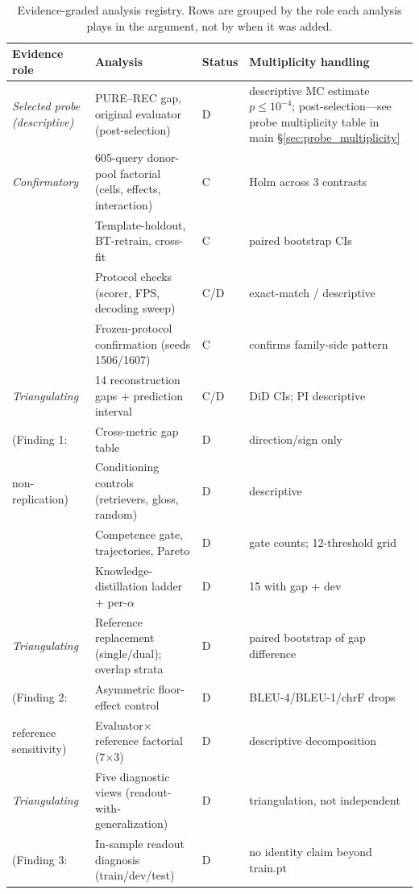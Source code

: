 \documentclass[pdflatex,sn-chicago]{sn-jnl}
\begin{document}
\begin{table}[h]
\centering
\scriptsize\setlength{\tabcolsep}{2pt}
\caption{Evidence-graded analysis registry. Rows are grouped by the role each analysis plays in the argument, not by when it was added.}
\label{tab:si_provenance}
\begin{tabular}{p{2.5cm}p{5.0cm}p{0.9cm}p{3.6cm}}
\toprule
Evidence role & Analysis & Status & Multiplicity handling \\
\midrule
\emph{Selected probe (descriptive)} & PURE--REC gap, original evaluator (post-selection) & D & descriptive MC estimate $p\leq10^{-4}$; post-selection---see probe multiplicity table in main \S\ref{sec:probe_multiplicity} \\
\addlinespace
\emph{Confirmatory} & 605-query donor-pool factorial (cells, effects, interaction) & C & Holm across 3 contrasts \\
 & Template-holdout, BT-retrain, cross-fit & C & paired bootstrap CIs \\
 & Protocol checks (scorer, FPS, decoding sweep) & C/D & exact-match / descriptive \\
 & Frozen-protocol confirmation (seeds 1506/1607) & C & confirms family-side pattern \\
\addlinespace
\emph{Triangulating} & 14 reconstruction gaps + prediction interval & C/D & DiD CIs; PI descriptive \\
 (Finding 1: & Cross-metric gap table & D & direction/sign only \\
  non-replication) & Conditioning controls (retrievers, gloss, random) & D & descriptive \\
 & Competence gate, trajectories, Pareto & D & gate counts; 12-threshold grid \\
 & Knowledge-distillation ladder + per-$\alpha$ & D & 15 with gap + dev \\
\addlinespace
\emph{Triangulating} & Reference replacement (single/dual); overlap strata & D & paired bootstrap of gap difference \\
 (Finding 2: & Asymmetric floor-effect control & D & BLEU-4/BLEU-1/chrF drops \\
  reference sensitivity) & Evaluator$\times$reference factorial (7$\times$3) & D & descriptive decomposition \\
\addlinespace
\emph{Triangulating} & Five diagnostic views (readout-with-generalization) & D & triangulation, not independent \\
 (Finding 3: & In-sample readout diagnosis (train/dev/test) & D & no identity claim beyond train.pt \\

\end{tabular}
\end{table}
\end{document}

